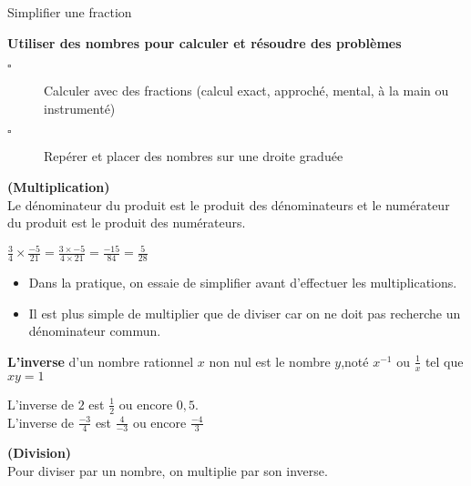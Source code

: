 \begin{titre}

{\LARGE {\color{bleu3}Simplifier une fraction}}
\end{titre}



\begin{CpsCol}
\textbf{Utiliser des nombres pour calculer et résoudre des problèmes}
\begin{description}
\item[$\square$] Calculer avec des fractions (calcul exact, approché, mental, à la main ou instrumenté)
\item[$\square$] Repérer et placer des nombres sur une droite graduée
\end{description}
\end{CpsCol}




\begin{reg}\textbf{(Multiplication)}\\
Le dénominateur du produit est le produit des dénominateurs et le numérateur du produit est le produit des numérateurs.
\end{reg}

   
\begin{Ex}   
$\frac{3}{4}\times \frac{-5}{21} = \frac{3\times{-5}}{4 \times 21}=\frac{-15}{84} = \frac{5}{28}$ 
\end{Ex}
\begin{Rq}   
\begin{itemize}
\item Dans la pratique, on essaie de \og simplifier \fg{} avant d'effectuer les multiplications.
\item Il est plus simple de multiplier que de diviser car on ne doit pas recherche un dénominateur commun.
\end{itemize}
\end{Rq}


\begin{Def}
\textbf{L'inverse} d'un nombre rationnel $x$ non nul est le nombre $y$,noté $x^{-1}$ ou $\frac{1}{x}$ tel que $xy=1$
\end{Def}

   
\begin{Ex}   
L'inverse de $2$ est $\frac{1}{2}$ ou encore $0,5$.\\
L'inverse de $\frac{-3}{4}$ est $\frac{4}{-3}$ ou encore $\frac{-4}{3}$
\end{Ex}


\begin{reg}\textbf{(Division)}\\
Pour diviser par un nombre, on multiplie par son inverse.
\end{reg}

